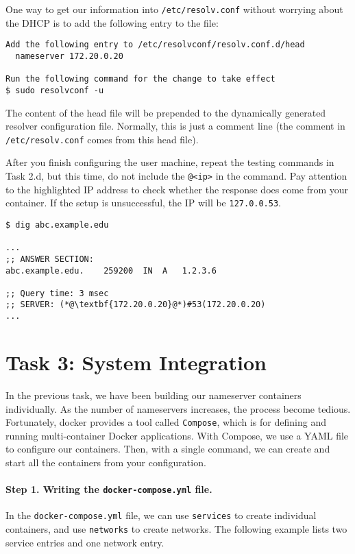 One way to get our information into \texttt{/etc/resolv.conf} without worrying about
the DHCP is to add the following entry to the 
file:

\begin{lstlisting}
Add the following entry to /etc/resolvconf/resolv.conf.d/head
  nameserver 172.20.0.20

Run the following command for the change to take effect
$ sudo resolvconf -u
\end{lstlisting}

The content of the head file will be prepended to the dynamically generated resolver
configuration file. Normally, this is just a comment line (the comment in
\texttt{/etc/resolv.conf} comes from this head file).


After you finish configuring the user machine, repeat 
the testing commands in Task 2.d, but this time, do not 
include the \texttt{@<ip>} in the command. Pay attention to 
the highlighted IP address to check whether the response does 
come from your container. If the setup is unsuccessful,
the IP will be \texttt{127.0.0.53}. 

\begin{lstlisting}
$ dig abc.example.edu

...
;; ANSWER SECTION:
abc.example.edu.	259200	IN	A	1.2.3.6

;; Query time: 3 msec
;; SERVER: (*@\textbf{172.20.0.20}@*)#53(172.20.0.20)
...
\end{lstlisting}
 




\section{Task 3: System Integration}

In the previous task, we have been building our nameserver containers 
individually. As the number of 
nameservers increases, the process become tedious. Fortunately,
docker provides a tool called \texttt{Compose}, which 
is for defining and running multi-container Docker applications. 
With Compose, we use a YAML file to configure our containers. Then, with a single command, 
we can create and start all the containers from your configuration.

\paragraph{Step 1. Writing the \texttt{docker-compose.yml} file.}
In the \texttt{docker-compose.yml} file, we can use \texttt{services} to 
create individual containers, and use \texttt{networks} to 
create networks. The following example lists two 
service entries and one network entry. 

